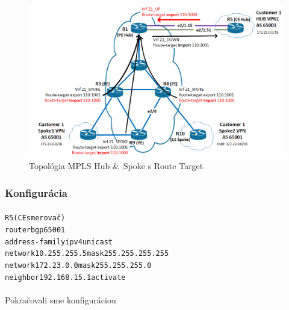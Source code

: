 \documentclass[12pt,twoside,a4paper]{report}
\begin{document}
\begin{figure}[!htbp]
\centering
\includegraphics[width=14cm,keepaspectratio]{mpls_hub_spoke_route_target_topo}
\caption{Topológia MPLS Hub \& Spoke s Route Target}
\label{fig:mpls_hub_spoke_route_target_topo}
\end{figure}

\subsubsection{Konfigurácia}
\paragraph{}

\noindent
{\selectfont
\begin{small}
\begin{alltt}
R5 (CE smerovač)
router bgp 65001
  address-family ipv4 unicast
    network 10.255.255.5 mask 255.255.255.255
    network 172.23.0.0 mask 255.255.255.0
    neighbor 192.168.15.1 activate
\end{alltt}
\end{small}
}

\paragraph{}
Pokračovali sme konfiguráciou 
\end{document}
